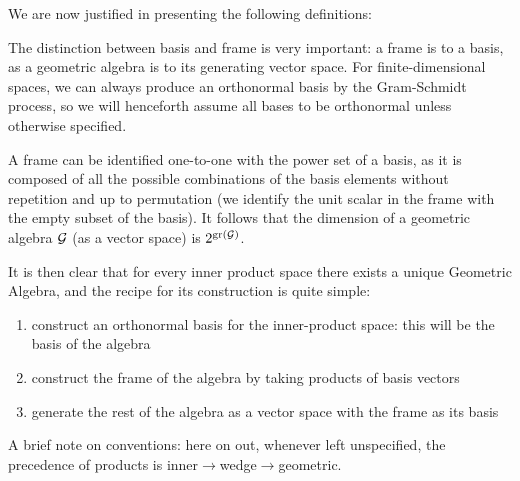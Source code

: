 We are now justified in presenting the following definitions:





The distinction between basis and frame is very important: a frame is to a basis, as a geometric algebra is to its generating vector space.
For finite-dimensional spaces, we can always produce an orthonormal basis by the Gram-Schmidt process, so we will henceforth assume all bases to be orthonormal unless otherwise specified.

A frame can be identified one-to-one with the power set of a basis, as it is composed of all the possible combinations of the basis elements without repetition and up to permutation (we identify the unit scalar in the frame with the empty subset of the basis). It follows that the dimension of a geometric algebra $\mathcal{G}$ (as a vector space) is $2^{\mathrm{gr}\left(\mathcal{G}\right)}$.

It is then clear that for every inner product space there exists a unique Geometric Algebra, and the recipe for its construction is quite simple:
\begin{enumerate}
	\item construct an orthonormal basis for the inner-product space: this will be the basis of the algebra
	\item construct the frame of the algebra by taking products of basis vectors
	\item generate the rest of the algebra as a vector space with the frame as its basis
\end{enumerate}

% 
% 

A brief note on conventions: here on out, whenever left unspecified, the precedence of products is inner$\to$wedge$\to$geometric.

%
%


